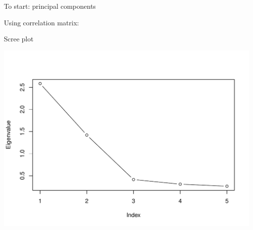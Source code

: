 \begin{frame}[fragile]{To start: principal components}

Using correlation matrix:

\begin{knitrout}
\color{fgcolor}\begin{kframe}
\begin{alltt}
\hlkwb{=}\hlstd{(}\hlstd{,}
\hlkwb{=}
\hlkwb{=}\hlstd{(}
\end{alltt}
\end{kframe}
\end{knitrout}

\end{frame}

\begin{frame}[fragile]{Scree plot}
   
\begin{knitrout}
\color{fgcolor}\begin{kframe}
\begin{alltt}
\hlopt{$}\hlopt{^}\hlstd{,}\hlstd{=}\hlstd{,}\hlstd{=}\hlstd{)}
\end{alltt}
\end{kframe}
\includegraphics[width=\maxwidth]{figure/unnamed-chunk-1-1} 

\end{knitrout}
  
  
\end{frame}

